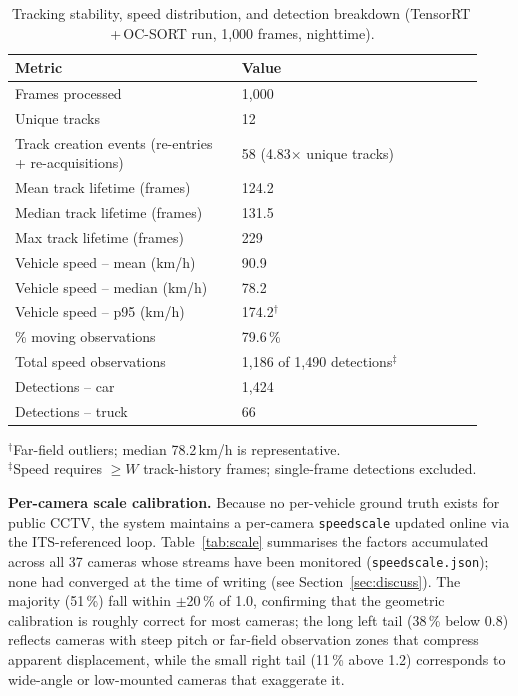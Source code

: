 \documentclass[conference]{IEEEtran}
\renewcommand{\_}{\textunderscore\allowbreak}
\begin{document}
\begin{table}[t]
\caption{Tracking stability, speed distribution, and detection breakdown
(TensorRT\,+\,OC-SORT run, 1{,}000 frames, nighttime).}
\label{tab:track}
\centering
\small
\begin{tabular}{@{}p{0.45\linewidth}p{0.48\linewidth}@{}}
\toprule
Metric & Value \\
\midrule
Frames processed              & 1{,}000 \\
Unique tracks                 & 12 \\
Track creation events (re-entries + re-acquisitions) & 58 (4.83$\times$ unique tracks) \\
Mean track lifetime (frames)  & 124.2 \\
Median track lifetime (frames) & 131.5 \\
Max track lifetime (frames)   & 229 \\
\midrule
Vehicle speed -- mean (km/h)  & 90.9 \\
Vehicle speed -- median (km/h) & 78.2 \\
Vehicle speed -- p95 (km/h)   & 174.2$^{\dagger}$ \\
\% moving observations        & 79.6\,\% \\
Total speed observations      & 1{,}186 of 1{,}490 detections$^{\ddagger}$ \\
\midrule
Detections -- car             & 1{,}424 \\
Detections -- truck           & 66 \\
\bottomrule
\end{tabular}
\vspace{2pt}
{\footnotesize $^{\dagger}$Far-field outliers; median 78.2\,km/h is representative.\\
$^{\ddagger}$Speed requires ${\ge}W$ track-history frames; single-frame detections excluded.}
\end{table}

\textbf{Per-camera scale calibration.}
Because no per-vehicle ground truth exists for public CCTV, the system maintains a
per-camera \texttt{speed\_scale} updated online via the ITS-referenced loop.
Table~\ref{tab:scale} summarises the factors accumulated across all 37 cameras whose
streams have been monitored (\texttt{speed\_scale.json}); none had converged at
the time of writing (see Section~\ref{sec:discuss}).
The majority (51\,\%) fall within $\pm$20\,\% of 1.0, confirming that the geometric
calibration is roughly correct for most cameras; the long left tail (38\,\% below 0.8)
reflects cameras with steep pitch or far-field observation zones that compress apparent
displacement, while the small right tail (11\,\% above 1.2) corresponds to
wide-angle or low-mounted cameras that exaggerate it.
\end{document}
